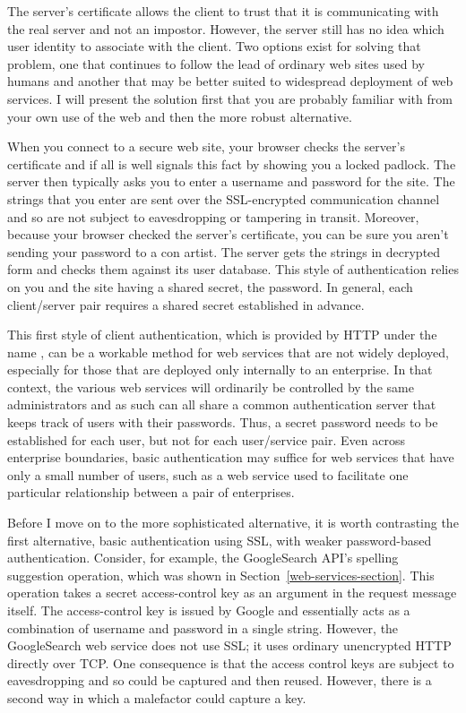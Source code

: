 The server's certificate allows the client to trust that it is
communicating with the real server and not an impostor.  However, the
server still has no idea which user identity to associate with the
client.  Two options exist for solving that problem, one that
continues to follow the lead of ordinary web sites used by humans and
another that may be better suited to widespread deployment of web
services.  I will present the solution first that you are probably
familiar with from your own use of the web and then the more robust
alternative.

When you connect to a secure web site, your browser checks the
server's certificate and if all is well signals this fact by showing
you a locked padlock.  The server then typically asks you to enter a
username and password for the site.  The strings that you enter are
sent over the SSL-encrypted communication channel and so are not
subject to eavesdropping or tampering in transit.  Moreover, because
your browser checked the server's certificate, you can be sure you
aren't sending your password to a con artist.  The server gets the
strings in decrypted form and checks them against its user database.
This style of authentication relies on you and the site having a
shared secret, the password.  In general, each client/server pair
requires a shared secret established in advance.

This first style of client authentication, which is provided by HTTP
under the name , can be a workable method for web
services that are not widely deployed, especially for those that are
deployed only internally to an enterprise.  In that context, the
various web services will ordinarily be controlled by the same
administrators and as such can all share a common authentication
server that keeps track of users
with their passwords.  Thus, a secret password needs to be established
for each user, but not for each user/service pair.  Even across
enterprise boundaries, basic authentication may suffice for web
services that have only a small number of users, such as a web service
used to facilitate one particular relationship between a pair of
enterprises.

Before I move on to the more sophisticated alternative, it is worth
contrasting the first alternative, basic authentication using SSL,
with weaker password-based authentication.  Consider, for example, the
GoogleSearch API's spelling suggestion operation, which was shown in
Section~\ref{web-services-section}.  This operation takes a secret
access-control key as an argument in the request message itself.  The
access-control key is issued by Google and essentially acts as a
combination of username and password in a single string.  However, the
GoogleSearch web service does not use SSL; it uses ordinary unencrypted
HTTP directly over TCP.  One consequence is that the access control
keys are subject to eavesdropping and so could be captured and then
reused.  However, there is a second way in which a malefactor could
capture a key.

